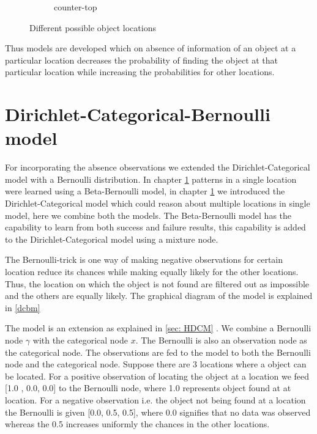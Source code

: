 \begin{figure}
\begin{subfigure}[b]{0.3\textwidth}
        \caption{counter-top}
        \label{fig:counter-top}
    \end{subfigure}
    \caption{Different possible object locations}\label{fig:alllocations}
\end{figure}


Thus models are developed which on absence of information of an object at a particular location decreases the probability of finding the object at that particular location while increasing the probabilities for other locations.


\FloatBarrier
\section{Dirichlet-Categorical-Bernoulli model}

For incorporating the absence observations we extended the Dirichlet-Categorical model  with a Bernoulli distribution.
In chapter \ref{} patterns in a single location were learned using a Beta-Bernoulli model, in chapter \ref{} we introduced the Dirichlet-Categorical model which could reason about multiple locations in single model, here we combine both the models. The Beta-Bernoulli model has the capability to learn from both success and failure results, this capability is added to the Dirichlet-Categorical model using a mixture node. 

The Bernoulli-trick is one way of making negative observations for certain location reduce its chances while making equally likely for the other locations. Thus, the location on which the object is not found are filtered out as impossible and the others are equally likely. The graphical diagram of the model is explained in \ref{dcbm}

The model is an extension as explained in \ref{sec: HDCM} . We combine a Bernoulli node $\gamma$ with the categorical node $x$. The Bernoulli is also an observation node as the categorical node. The observations are fed to the model to both the Bernoulli node and the categorical node. Suppose there are 3 locations where a object can be located. For a positive observation of locating the object at a location we feed [1.0 , 0.0, 0.0] to the Bernoulli node, where 1.0 represents object found at at location. For a negative observation i.e. the object not being found at a location the Bernoulli is given [0.0, 0.5, 0.5], where 0.0 signifies that no data was observed whereas the 0.5 increases uniformly the chances in the other locations.


